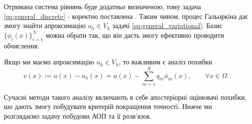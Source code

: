 Отримана система рівнянь буде додатньо визначеною, тому задача \eqref{eq:general_discrete} - коректно поставлена \cite{OstShynAee11}.
Таким чином, процес Гальоркіна дає змогу знайти апроксимацію $u_h \in V_h$ задачі \eqref{eq:general_variational}.
Базис $\lbrace \phi_i(x)\rbrace_{i=1}^N$ можна обрати так, що він дасть змогу ефективно проводити обчислення.


Якщо ми маємо апроксимацію $u_h \in V_h$, то важливим є аналіз похибки
%
\begin{equation}
	e(x) := u(x) - u_h(x) = u(x) - \sum\limits_{m=1}^N q_m \phi_m (x), \qquad \forall x \in \Omega.
\end{equation}

Сучасні методи такого аналізу включають в себе апостеріорні оцінювачі похибки, шо дають змогу побудувати критерій покращення точності.
Нижче ми розглядаємо задачу побудови АОП та її розв'язок.
